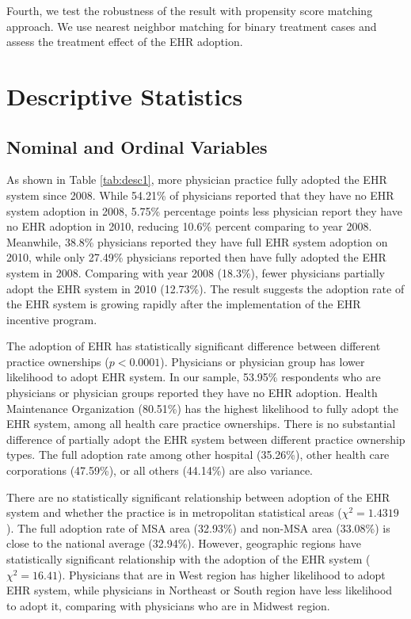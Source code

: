 \documentclass[12pt]{report}
\begin{document}
Fourth, we test the robustness of the result with propensity score matching approach. We use nearest neighbor matching for binary treatment cases and assess the treatment effect of the EHR adoption.


\chapter{Descriptive Statistics}

\section{Nominal and Ordinal Variables}

As shown in Table \ref{tab:desc1}, more physician practice fully adopted the EHR system since 2008. While 54.21\% of physicians reported that they have no EHR system adoption in 2008, 5.75\% percentage points less physician report they have no EHR adoption in 2010, reducing 10.6\% percent comparing to year 2008. Meanwhile, 38.8\% physicians reported they have full EHR system adoption on 2010, while only 27.49\% physicians reported then have fully adopted the EHR system in 2008. Comparing with year 2008 (18.3\%), fewer physicians partially adopt the EHR system in 2010 (12.73\%). The result suggests the adoption rate of the EHR system is growing rapidly after the implementation of the EHR incentive program.

The adoption of EHR has statistically significant difference between different practice ownerships ($p<0.0001$). Physicians or physician group has lower likelihood to adopt EHR system. In our sample, 53.95\% respondents who are physicians or physician groups reported they have no EHR adoption. Health Maintenance Organization (80.51\%) has the highest likelihood to fully adopt the EHR system, among all health care practice ownerships. There is no substantial difference of partially adopt the EHR system between different practice ownership types. The full adoption rate among other hospital (35.26\%), other health care corporations (47.59\%), or all others (44.14\%) are also variance. 

There are no statistically significant relationship between adoption of the EHR system and whether the practice is in metropolitan statistical areas ($\chi^2=1.4319$). The full adoption rate of MSA area (32.93\%) and non-MSA area (33.08\%) is close to the national average (32.94\%). However, geographic regions have statistically significant relationship with the adoption of the EHR system ($\chi^2=16.41$). Physicians that are in West region has higher likelihood to adopt EHR system, while physicians in Northeast or South region have less likelihood to adopt it, comparing with physicians who are in Midwest region.
\end{document}
